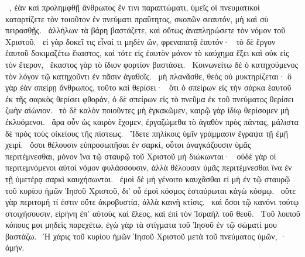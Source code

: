 ~, ἐὰν καὶ προλημφθῇ ἄνθρωπος ἔν τινι παραπτώματι, ὑμεῖς οἱ πνευματικοὶ καταρτίζετε τὸν τοιοῦτον ἐν πνεύματι πραΰτητος, σκοπῶν σεαυτόν, μὴ καὶ σὺ πειρασθῇς.
~ἀλλήλων τὰ βάρη βαστάζετε, καὶ οὕτως ἀναπληρώσετε τὸν νόμον τοῦ Χριστοῦ.
~εἰ γὰρ δοκεῖ τις εἶναί τι μηδὲν ὤν, φρεναπατᾷ ἑαυτόν·
~τὸ δὲ ἔργον ἑαυτοῦ δοκιμαζέτω ἕκαστος, καὶ τότε εἰς ἑαυτὸν μόνον τὸ καύχημα ἕξει καὶ οὐκ εἰς τὸν ἕτερον,
~ἕκαστος γὰρ τὸ ἴδιον φορτίον βαστάσει.
~Κοινωνείτω δὲ ὁ κατηχούμενος τὸν λόγον τῷ κατηχοῦντι ἐν πᾶσιν ἀγαθοῖς.
~μὴ πλανᾶσθε, θεὸς οὐ μυκτηρίζεται· ὃ γὰρ ἐὰν σπείρῃ ἄνθρωπος, τοῦτο καὶ θερίσει·
~ὅτι ὁ σπείρων εἰς τὴν σάρκα ἑαυτοῦ ἐκ τῆς σαρκὸς θερίσει φθοράν, ὁ δὲ σπείρων εἰς τὸ πνεῦμα ἐκ τοῦ πνεύματος θερίσει ζωὴν αἰώνιον.
~τὸ δὲ καλὸν ποιοῦντες μὴ ἐγκακῶμεν, καιρῷ γὰρ ἰδίῳ θερίσομεν μὴ ἐκλυόμενοι.
~ἄρα οὖν ὡς καιρὸν ἔχομεν, ἐργαζώμεθα τὸ ἀγαθὸν πρὸς πάντας, μάλιστα δὲ πρὸς τοὺς οἰκείους τῆς πίστεως.
~Ἴδετε πηλίκοις ὑμῖν γράμμασιν ἔγραψα τῇ ἐμῇ χειρί.
~ὅσοι θέλουσιν εὐπροσωπῆσαι ἐν σαρκί, οὗτοι ἀναγκάζουσιν ὑμᾶς περιτέμνεσθαι, μόνον ἵνα τῷ σταυρῷ τοῦ Χριστοῦ μὴ διώκωνται·
~οὐδὲ γὰρ οἱ περιτεμνόμενοι αὐτοὶ νόμον φυλάσσουσιν, ἀλλὰ θέλουσιν ὑμᾶς περιτέμνεσθαι ἵνα ἐν τῇ ὑμετέρᾳ σαρκὶ καυχήσωνται.
~ἐμοὶ δὲ μὴ γένοιτο καυχᾶσθαι εἰ μὴ ἐν τῷ σταυρῷ τοῦ κυρίου ἡμῶν Ἰησοῦ Χριστοῦ, δι’ οὗ ἐμοὶ κόσμος ἐσταύρωται κἀγὼ κόσμῳ.
~οὔτε γὰρ περιτομή τί ἐστιν οὔτε ἀκροβυστία, ἀλλὰ καινὴ κτίσις.
~καὶ ὅσοι τῷ κανόνι τούτῳ στοιχήσουσιν, εἰρήνη ἐπ’ αὐτοὺς καὶ ἔλεος, καὶ ἐπὶ τὸν Ἰσραὴλ τοῦ θεοῦ.
~Τοῦ λοιποῦ κόπους μοι μηδεὶς παρεχέτω, ἐγὼ γὰρ τὰ στίγματα τοῦ Ἰησοῦ ἐν τῷ σώματί μου βαστάζω.
~Ἡ χάρις τοῦ κυρίου ἡμῶν Ἰησοῦ Χριστοῦ μετὰ τοῦ πνεύματος ὑμῶν, · ἀμήν.


